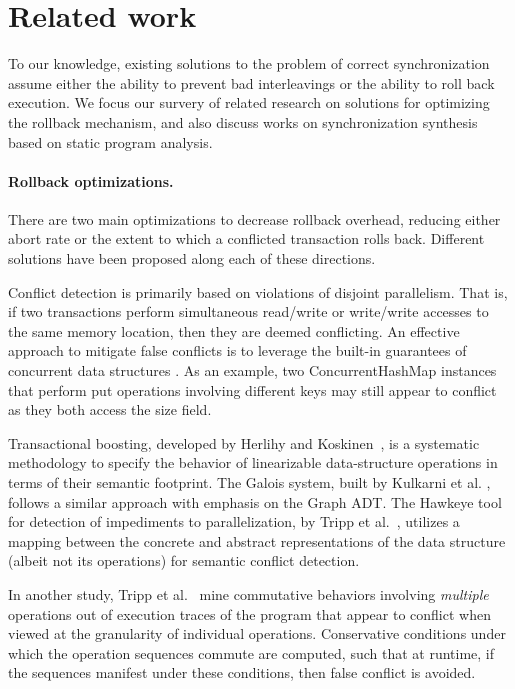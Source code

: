 \section{Related work}
To our knowledge, existing solutions to the problem of correct synchronization assume either the ability to prevent bad interleavings or the ability to roll back execution. We focus our survery of related research on solutions for optimizing the rollback mechanism, and also discuss works on synchronization synthesis based on static program analysis.

\paragraph{Rollback optimizations.}
There are two main optimizations to decrease rollback overhead, reducing either abort rate or the extent to which a conflicted transaction rolls back. Different solutions have been proposed along each of these directions.

Conflict detection is primarily based on violations of disjoint parallelism. That is, if two transactions perform simultaneous read/write or write/write accesses to the same memory location, then they are deemed conflicting. 
%
An effective approach to mitigate false conflicts is to leverage the built-in guarantees of concurrent data structures \cite{ppopp/HerlihyK08,Galois,TYFS:OOPSLA11}. As an example, two {\sf ConcurrentHashMap} instances that perform {\sf put} operations involving different keys may still appear to conflict as they both access the {\sf size} field.

Transactional boosting, developed by Herlihy and Koskinen~\cite{ppopp/HerlihyK08}, is a systematic methodology to specify the behavior of linearizable data-structure operations in terms of their semantic footprint. The Galois system, built by Kulkarni et al. \cite{Galois}, follows a similar approach with emphasis on the {\sf Graph} ADT. The Hawkeye tool for detection of impediments to parallelization, by Tripp et al.~\cite{TYFS:OOPSLA11}, utilizes a mapping between the concrete and abstract representations of the data structure (albeit not its operations) for semantic conflict detection.  

In another study, Tripp et al.~\cite{TMFS:PLDI12} mine commutative behaviors involving \emph{multiple} operations out of execution traces of the program that appear to conflict when viewed at the granularity of individual operations. Conservative conditions under which the operation sequences commute are computed, such that at runtime, if the sequences manifest under these conditions, then false conflict is avoided.

